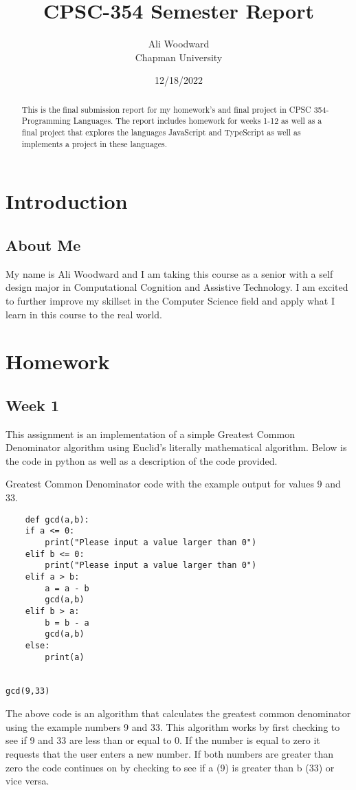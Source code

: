 \documentclass{article}
\title{CPSC-354 Semester Report}
\author{Ali Woodward \\ Chapman University}
\date{12/18/2022}
\theoremstyle{theorem}
\theoremstyle{definition}
\theoremstyle{remark}
\begin{document}
\maketitle

\begin{abstract}
This is the final submission report for my homework's and final project in CPSC 354- Programming Languages. The report includes homework for weeks 1-12 as well as a final project that explores the languages JavaScript and TypeScript as well as implements a project in these languages.
\end{abstract}

\tableofcontents

\section{Introduction}\label{introduction}

\subsection{About Me}

My name is Ali Woodward and I am taking this course as a senior with a self design major in Computational Cognition and Assistive Technology.
I am excited to further improve my skillset in the Computer Science field and apply what I learn in this course to the real world.

\section{Homework}\label{homework}


\subsection{Week 1}

This assignment is an implementation of a simple Greatest Common Denominator
algorithm using Euclid's literally mathematical algorithm. Below is the code in python as well as a description of the code provided.

\medskip\noindent
Greatest Common Denominator code with the example output for values 9 and 33.

\begin{lstlisting}
    def gcd(a,b):
    if a <= 0:
        print("Please input a value larger than 0")
    elif b <= 0:
        print("Please input a value larger than 0")
    elif a > b:
        a = a - b
        gcd(a,b)
    elif b > a:
        b = b - a
        gcd(a,b)
    else:
        print(a)


gcd(9,33)

\end{lstlisting}
The above code is an algorithm that calculates the greatest common denominator using the example numbers 9 and 33.
This algorithm works by first checking to see if 9 and 33 are less than or equal to 0. If the number is equal to zero it requests that the user enters a new number.
If both numbers are greater than zero the code continues on by checking to see if a (9) is greater than b (33) or vice versa.
\end{document}
